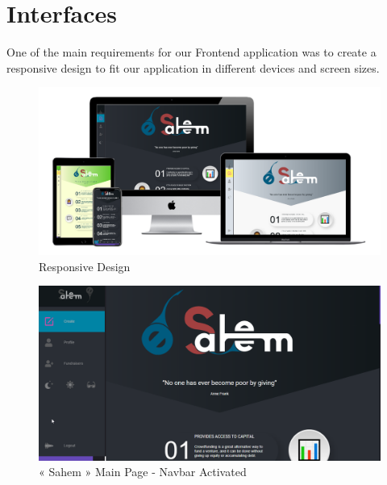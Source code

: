 
\section{Interfaces}

One of the main requirements for our Frontend application was to create a responsive design to fit our
application in different devices and screen sizes. 

\begin{figure}[H]
      \centering
      \includegraphics[scale=0.45]{assets/allDevices.png}
      \caption{Responsive Design}
      \label{fig:all devices}
\end{figure}


\begin{figure}[H]
      \centering
      \includegraphics[scale=0.45]{assets/screen-main-navbar.png}
      \caption{« Sahem » Main Page - Navbar Activated}
      \label{fig:sahem main}
\end{figure}

